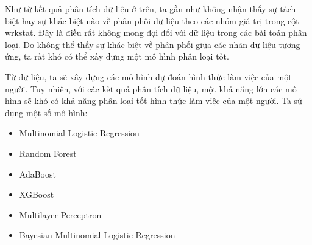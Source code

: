 Như từ kết quả phân tích dữ liệu ở trên, ta gần như không nhận thấy sự tách biệt hay sự khác biệt nào về phân phối dữ liệu theo các nhóm giá trị trong cột wrkstat.
Đây là điều rất không mong đợi đối với dữ liệu trong các bài toán phân loại.
Do không thể thấy sự khác biệt về phân phối giữa các nhãn dữ liệu tương ứng, ta rất khó có thể xây dựng một mô hình phân loại tốt.

Từ dữ liệu, ta sẽ xây dựng các mô hình dự đoán hình thức làm việc của một người.
Tuy nhiên, với các kết quả phân tích dữ liệu, một khả năng lớn các mô hình sẽ khó có khả năng phân loại tốt hình thức làm việc của một người.
Ta sử dụng một số mô hình:

\begin{itemize}
    \item Multinomial Logistic Regression
    \item Random Forest
    \item AdaBoost
    \item XGBoost
    \item Multilayer Perceptron
    \item Bayesian Multinomial Logistic Regression
\end{itemize}
